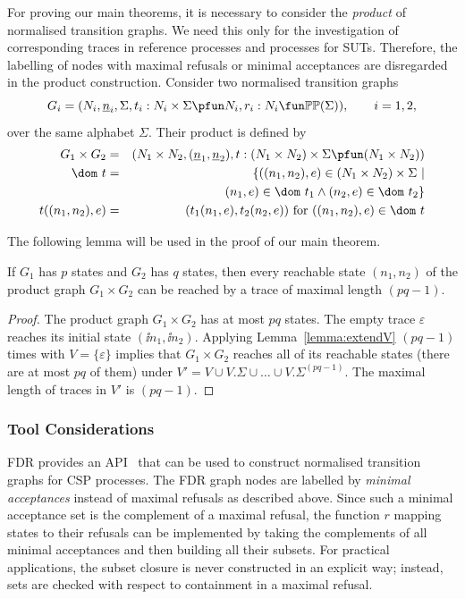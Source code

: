 For proving our main theorems, it is necessary to consider the \emph{product}
of normalised transition graphs. We need this only for the investigation of
corresponding traces in reference processes and processes for SUTs.
Therefore, the labelling of nodes with maximal refusals or minimal
acceptances are disregarded in the product construction. Consider two
normalised transition graphs
\[
G_i = ( N_i, \ii n_i, \Sigma, t_i : N_i\times\Sigma \pfun N_i, r_i : N_i \fun \mathbb{P}\mathbb{P}(\Sigma)),\qquad i = 1,2,
\]
over the same alphabet $\Sigma$. Their product is defined by
\begin{eqnarray}
G_1\times G_2 & = & (N_1\times N_2,(\ii n_1,\ii n_2), t:(N_1\times N_2)\times\Sigma\pfun (N_1\times N_2))
\\
\dom~t & = & \{ ((n_1,n_2),e)\in (N_1\times N_2)\times\Sigma~|   \nonumber
\\ & & \tabc
(n_1,e)\in\dom~t_1\wedge
(n_2,e) \in\dom~t_2    \}
\\
t((n_1,n_2),e) & = & (t_1(n_1,e),t_2(n_2,e))\ \text{for $((n_1,n_2),e)\in\dom~t$}
\end{eqnarray}

The following lemma will be used in the proof of our main theorem. 
\begin{lemma}\label{lemma:reachproduc}
If $G_1$ has $p$ states and $G_2$ has $q$ states, then every reachable state
$(n_1,n_2)$ of the product graph $G_1\times G_2$ can be reached by a trace 
of maximal length $(pq-1)$.
\end{lemma}
\begin{proof}
The product graph $G_1\times G_2$ has at most $pq$ states. The empty trace $\varepsilon$
reaches its initial state $(\ii n_1,\ii n_2)$. Applying Lemma~\ref{lemma:extendV}
$(pq-1)$ times with $V=\{\varepsilon \}$ implies that $G_1\times G_2$ reaches
all of its reachable states (there are at most $pq$ of them) under 
$V' = V \cup V.\Sigma\cup\dots \cup V.\Sigma^{(pq-1)}$. The maximal length of traces in
$V'$ is $(pq-1)$.
\xbox
\end{proof}


\subsubsection*{Tool Considerations}
FDR provides an API~\cite{fdrmanual} that can be used to construct normalised
transition graphs for CSP processes. The FDR graph nodes are labelled by
\emph{minimal acceptances} instead of maximal refusals as described above.
Since such a minimal acceptance set is the complement of a maximal refusal,
the function $r$ mapping states to their refusals can be implemented by
taking the complements of all minimal acceptances and then building all their
subsets. For practical applications, the subset closure is never constructed
in an explicit way; instead, sets are checked with respect to containment in
a maximal refusal.

